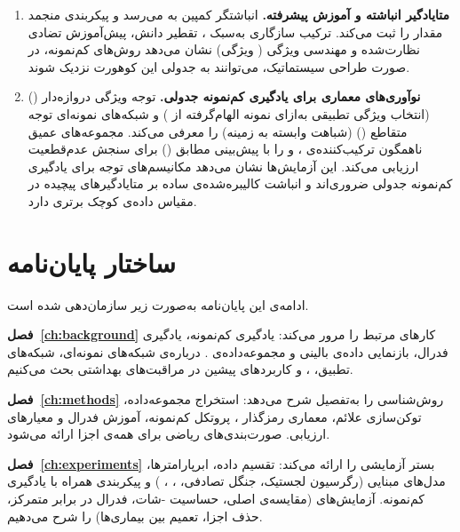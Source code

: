 \begin{enumerate}
\item \textbf{متایادگیر انباشته و آموزش پیشرفته.} انباشتگر کمپین  به   می‌رسد و پیکربندی منجمد \texttt{} مقدار \textbf{} را ثبت می‌کند. ترکیب سازگاری به‌سبک ، تقطیر دانش، پیش‌آموزش تضادی نظارت‌شده و مهندسی ویژگی ( ویژگی) نشان می‌دهد روش‌های کم‌نمونه، در صورت طراحی سیستماتیک، می‌توانند به  جدولی این کوهورت نزدیک شوند.

\item \textbf{نوآوری‌های معماری برای یادگیری کم‌نمونه جدولی.}  توجه ویژگی دروازه‌دار () (انتخاب ویژگی تطبیقی به‌ازای نمونه الهام‌گرفته از ) و شبکه‌های نمونه‌ای توجه متقاطع () (شباهت وابسته به زمینه) را معرفی می‌کند.  مجموعه‌های عمیق ناهمگون ترکیب‌کننده‌ی ،  و  را با پیش‌بینی مطابق () برای سنجش عدم‌قطعیت ارزیابی می‌کند. این آزمایش‌ها نشان می‌دهد مکانیسم‌های توجه برای یادگیری کم‌نمونه جدولی ضروری‌اند و انباشت کالیبره‌شده‌ی ساده بر متایادگیرهای پیچیده در مقیاس داده‌ی کوچک برتری دارد.
\end{enumerate}

\section{ساختار پایان‌نامه}

ادامه‌ی این پایان‌نامه به‌صورت زیر سازمان‌دهی شده است.

\textbf{فصل~\ref{ch:background}} کارهای مرتبط را مرور می‌کند: یادگیری کم‌نمونه، یادگیری فدرال، بازنمایی داده‌ی بالینی و مجموعه‌داده‌ی . درباره‌ی شبکه‌های نمونه‌ای، شبکه‌های تطبیق، ،  و کاربردهای پیشین در مراقبت‌های بهداشتی بحث می‌کنیم.

\textbf{فصل~\ref{ch:methods}} روش‌شناسی را به‌تفصیل شرح می‌دهد: استخراج مجموعه‌داده، توکن‌سازی علائم، معماری رمزگذار ، پروتکل کم‌نمونه، آموزش فدرال و معیارهای ارزیابی. صورت‌بندی‌های ریاضی برای همه‌ی اجزا ارائه می‌شود.

\textbf{فصل~\ref{ch:experiments}} بستر آزمایشی را ارائه می‌کند: تقسیم داده، ابرپارامترها، مدل‌های مبنایی (رگرسیون لجستیک، جنگل تصادفی، ، ، ) و پیکربندی  همراه با یادگیری کم‌نمونه. آزمایش‌های  (مقایسه‌ی اصلی، حساسیت -شات، فدرال در برابر متمرکز، حذف اجزا، تعمیم بین بیماری‌ها) را شرح می‌دهیم.

